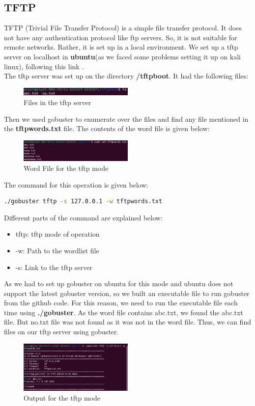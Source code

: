 \documentclass[12 pt]{article}
\begin{document}
\subsection{TFTP}
TFTP (Trivial File Transfer Protocol) is a simple file transfer protocol. It does not have any authentication protocol like ftp servers. So, it is not suitable for remote networks. Rather, it is set up in a local environment. We set up a tftp server on localhost in \textbf{ubuntu}(as we faced some problems setting it up on kali linux), following this link \cite{tftp}.\\
The tftp server was set up on the directory \textbf{/tftpboot}. It had the following files:
\begin{figure}[H]
    \centering
    \includegraphics[width=0.5\textwidth]{tftp_Server_Files.png}
    \caption{Files in the tftp server}
    \label{fig: tftp Server Files}
\end{figure}
Then we used gobuster to enumerate over the files and find any file mentioned in the \textbf{tftpwords.txt} file. The contents of the word file is given below:
\begin{figure}[H]
    \centering
    \includegraphics[width=0.5\textwidth]{tftp_Word_File.png}
    \caption{Word File for the tftp mode}
    \label{fig: tftp Word File}
\end{figure}
The command for this operation is given below:
\begin{lstlisting}[language=bash]
./gobuster tftp -s 127.0.0.1 -w tftpwords.txt
\end{lstlisting}
Different parts of the command are explained below:
\begin{itemize}
    \item tftp: tftp mode of operation
    \item -w: Path to the wordlist file
    \item -s: Link to the tftp server
\end{itemize}
As we had to set up gobuster on ubuntu for this mode and ubuntu does not support the latest gobuster version, so we built an executable file to run gobuster from the github code. For this reason, we need to run the executable file each time using \textbf{./gobuster}. As the word file contains abc.txt, we found the abc.txt file. But no.txt file was not found as it was not in the word file. Thus, we can find files on our tftp server using gobuster.
\begin{figure}[H]
    \centering
    \includegraphics[width=0.5\textwidth]{tftp_Output.png}
    \caption{Output for the tftp mode}
    \label{fig: tftp Output}
\end{figure}
\printbibliography[title={References}]
\end{document}
